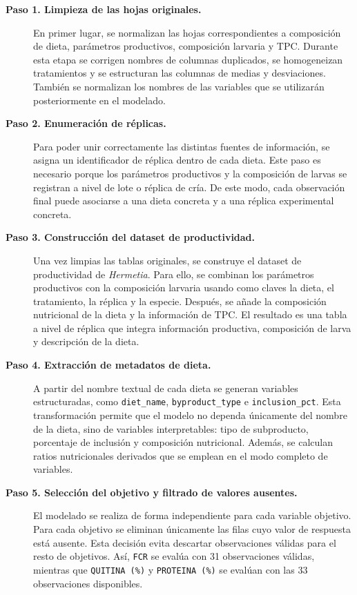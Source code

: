 \begin{description}
\item[\textbf{Paso 1. Limpieza de las hojas originales.}]
En primer lugar, se normalizan las hojas correspondientes a composición de dieta, parámetros productivos, composición larvaria y TPC. Durante esta etapa se corrigen nombres de columnas duplicados, se homogeneizan tratamientos y se estructuran las columnas de medias y desviaciones. También se normalizan los nombres de las variables que se utilizarán posteriormente en el modelado.
\item[\textbf{Paso 2. Enumeración de réplicas.}]
Para poder unir correctamente las distintas fuentes de información, se asigna un identificador de réplica dentro de cada dieta. Este paso es necesario porque los parámetros productivos y la composición de larvas se registran a nivel de lote o réplica de cría. De este modo, cada observación final puede asociarse a una dieta concreta y a una réplica experimental concreta.
\item[\textbf{Paso 3. Construcción del dataset de productividad.}]
Una vez limpias las tablas originales, se construye el dataset de productividad de \emph{Hermetia}. Para ello, se combinan los parámetros productivos con la composición larvaria usando como claves la dieta, el tratamiento, la réplica y la especie. Después, se añade la composición nutricional de la dieta y la información de TPC. El resultado es una tabla a nivel de réplica que integra información productiva, composición de larva y descripción de la dieta.
\item[\textbf{Paso 4. Extracción de metadatos de dieta.}]
A partir del nombre textual de cada dieta se generan variables estructuradas, como \texttt{diet\_name}, \texttt{byproduct\_type} e \texttt{inclusion\_pct}. Esta transformación permite que el modelo no dependa únicamente del nombre de la dieta, sino de variables interpretables: tipo de subproducto, porcentaje de inclusión y composición nutricional. Además, se calculan ratios nutricionales derivados que se emplean en el modo completo de variables.
\item[\textbf{Paso 5. Selección del objetivo y filtrado de valores ausentes.}]
El modelado se realiza de forma independiente para cada variable objetivo. Para cada objetivo se eliminan únicamente las filas cuyo valor de respuesta está ausente. Esta decisión evita descartar observaciones válidas para el resto de objetivos. Así, \texttt{FCR} se evalúa con 31 observaciones válidas, mientras que \texttt{QUITINA\ (\%)} y \texttt{PROTEINA\ (\%)} se evalúan con las 33 observaciones disponibles.

\end{description}
